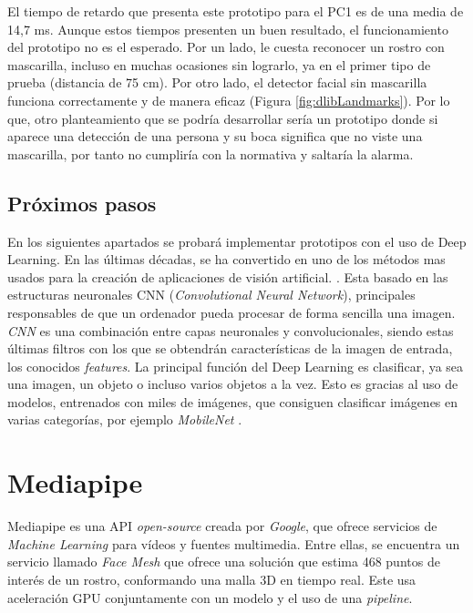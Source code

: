 El tiempo de retardo que presenta este prototipo para el PC1 es de una media de 14,7 ms. Aunque estos tiempos presenten un buen resultado, el funcionamiento del prototipo no es el esperado. Por un lado, le cuesta reconocer un rostro con mascarilla, incluso en muchas ocasiones sin lograrlo, ya en el primer tipo de prueba (distancia de 75 cm). Por otro lado, el detector facial sin mascarilla funciona correctamente y de manera eficaz (Figura \ref{fig:dlibLandmarks}). Por lo que, otro planteamiento que se podría desarrollar sería un prototipo donde si aparece una detección de una persona y su boca significa que no viste una mascarilla, por tanto no cumpliría con la normativa y saltaría la alarma.

\vspace{-0.8cm}
\subsection*{Próximos pasos}
\vspace{-0.5cm}
En los siguientes apartados se probará implementar prototipos con el uso de Deep Learning. En las últimas décadas, se ha convertido en uno de los métodos mas usados para la creación de aplicaciones de visión artificial. \cite{szeliski_2018}. Esta basado en las estructuras neuronales CNN (\textit{Convolutional Neural Network}), principales responsables de que un ordenador pueda procesar de forma sencilla una imagen. \textit{CNN} es una combinación entre capas neuronales y convolucionales, siendo estas últimas filtros con los que se obtendrán características de la imagen de entrada, los conocidos \textit{features}. La principal función del Deep Learning es clasificar, ya sea una imagen, un objeto o incluso varios objetos a la vez. Esto es gracias al uso de modelos, entrenados con miles de imágenes, que consiguen clasificar imágenes en varias categorías, por ejemplo \textit{MobileNet} \cite{cnn}. 

\newpage
\section{Mediapipe}

Mediapipe es una API \textit{open-source} creada por \textit{Google}, que ofrece servicios de \textit{Machine Learning} para vídeos y fuentes multimedia. Entre ellas, se encuentra un servicio llamado \textit{Face Mesh} que ofrece una solución que estima 468 puntos de interés de un rostro, conformando una malla 3D en tiempo real. Este usa aceleración GPU conjuntamente con un modelo y el uso de una \textit{pipeline}.

